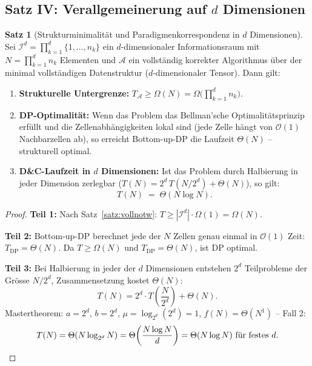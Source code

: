 ﻿\documentclass[a4paper,12pt]{article}
\theoremstyle{definition}
\newtheorem{satz}{Satz}
\begin{document}
\subsection{Satz IV: Verallgemeinerung auf $d$ Dimensionen}

\begin{satz}[Strukturminimalit\"{a}t und Paradigmenkorrespondenz in $d$ Dimensionen]
    \label{satz:ddim}
    Sei $\mathcal{I}^d = \prod_{k=1}^d \{1, \ldots, n_k\}$ ein $d$-dimensionaler
    Informationsraum mit $N = \prod_{k=1}^d n_k$ Elementen und $\mathcal{A}$
    ein vollst\"{a}ndig korrekter Algorithmus \"{u}ber der minimal vollst\"{a}ndigen
    Datenstruktur ($d$-dimensionaler Tensor). Dann gilt:
    \begin{enumerate}
        \item \textbf{Strukturelle Untergrenze:}
              $T_{\mathcal{A}} \geq \Omega(N) = \Omega\bigl(\prod_{k=1}^d n_k\bigr)$.
        \item \textbf{DP-Optimalit\"{a}t:} Wenn das Problem das Bellman'sche
              Optimalit\"{a}tsprinzip erf\"{u}llt und die Zellenabh\"{a}ngigkeiten
              lokal sind (jede Zelle h\"{a}ngt von $\mathcal{O}(1)$ Nachbarzellen
              ab), so erreicht Bottom-up-DP die Laufzeit $\Theta(N)$ --
              strukturell optimal.
        \item \textbf{D\&C-Laufzeit in $d$ Dimensionen:}
              Ist das Problem durch Halbierung in jeder Dimension zerlegbar
              ($T(N) = 2^d\,T(N/2^d) + \Theta(N)$), so gilt:
              \[
                  T(N) \;=\; \Theta\!\left(N \log N\right).
              \]
    \end{enumerate}
\end{satz}

\begin{proof}
    \textbf{Teil 1:} Nach Satz~\ref{satz:vollnotw}:
    $T \geq |\mathcal{I}^d| \cdot \Omega(1) = \Omega(N)$.

    \textbf{Teil 2:} Bottom-up-DP berechnet jede der $N$ Zellen genau einmal
    in $\mathcal{O}(1)$ Zeit: $T_{\mathrm{DP}} = \Theta(N)$.
    Da $T \geq \Omega(N)$ und $T_{\mathrm{DP}} = \Theta(N)$, ist DP optimal.

    \textbf{Teil 3:} Bei Halbierung in jeder der $d$ Dimensionen entstehen
    $2^d$ Teilprobleme der Gr\"{o}sse $N/2^d$, Zusammensetzung kostet $\Theta(N)$:
    \[
        T(N) = 2^d \cdot T\!\left(\frac{N}{2^d}\right) + \Theta(N).
    \]
    Mastertheorem: $a = 2^d$, $b = 2^d$,
    $\mu = \log_{2^d}(2^d) = 1$, $f(N) = \Theta(N^1)$ -- Fall 2:
    \[
        T(N) = \Theta(N \log_{2^d} N)
             = \Theta\!\left(\frac{N \log N}{d}\right)
             = \Theta(N \log N) \text{ f\"{u}r festes } d. \qedhere
    \]
\end{proof}
\end{document}
